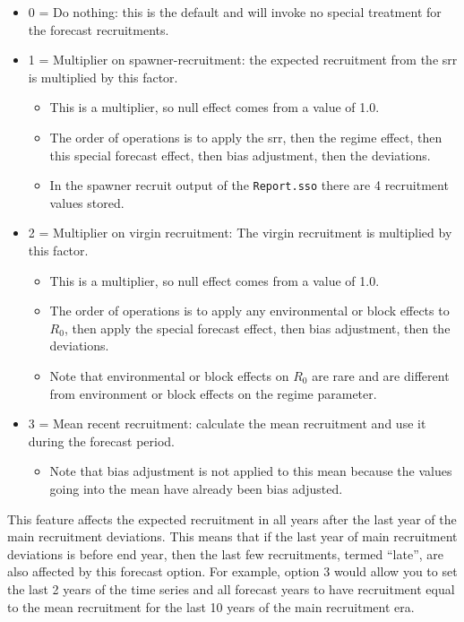 \begin{itemize}
	\item 0 = Do nothing: this is the default and will invoke no special treatment for the forecast recruitments.
	\item 1 = Multiplier on spawner-recruitment: the expected recruitment from the \gls{srr} is multiplied by this factor.
	\begin{itemize}
		\item This is a multiplier, so null effect comes from a value of 1.0.
		\item The order of operations is to apply the \gls{srr}, then the regime effect, then this special forecast effect, then bias adjustment, then the deviations.
		\item In the spawner recruit output of the \texttt{Report.sso} there are 4 recruitment values stored.
	\end{itemize}
	\item 2 = Multiplier on virgin recruitment: The virgin recruitment is multiplied by this factor.
	\begin{itemize}
		\item This is a multiplier, so null effect comes from a value of 1.0.
		\item The order of operations is to apply any environmental or block effects to $R_{0}$, then apply the special forecast effect, then bias adjustment, then the deviations.
		\item Note that environmental or block effects on $R_{0}$ are rare and are different from environment or block effects on the regime parameter.
	\end{itemize}
	\item 3 = Mean recent recruitment: calculate the mean recruitment and use it during the forecast period.
	\begin{itemize}
		\item Note that bias adjustment is not applied to this mean because the values going into the mean have already been bias adjusted.
	\end{itemize}
\end{itemize}

This feature affects the expected recruitment in all years after the last year of the main recruitment deviations. This means that if the last year of main recruitment deviations is before end year, then the last few recruitments, termed ``late'', are also affected by this forecast option. For example, option 3 would allow you to set the last 2 years of the time series and all forecast years to have recruitment equal to the mean recruitment for the last 10 years of the main recruitment era.

\pagebreak
